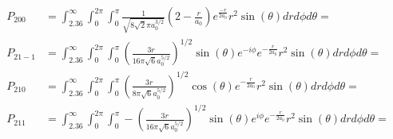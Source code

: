 \documentclass[10pt]{article} %
\begin{document}
\begin{align*}
  P_{200} &= \int_{2.36}^\infty \int_0^{2\pi} \int_0^\pi
  \frac{1}{\sqrt{8\sqrt{2}\pi a_0^{3/2}}}\left(2-\frac{r}{a_0}\right)e^{\frac{-r}{2a_0}}
  r^2\sin(\theta)drd\phi d\theta = \\
  P_{21-1} &= \int_{2.36}^\infty \int_0^{2\pi} \int_0^\pi
  \left(\frac{3r}{16\pi\sqrt{6}a_0^{5/2}}\right)^{1/2}\sin(\theta)e^{-i\phi}e^{-\frac{r}{2a_0}}
  r^2\sin(\theta)drd\phi d\theta = \\
  P_{210} &= \int_{2.36}^\infty \int_0^{2\pi} \int_0^\pi
  \left(\frac{3r}{8\pi\sqrt{6}a_0^{5/2}}\right)^{1/2}\cos(\theta)e^{-\frac{r}{2a_0}}
  r^2\sin(\theta)drd\phi d\theta = \\
  P_{211} &= \int_{2.36}^\infty \int_0^{2\pi} \int_0^\pi
  -\left(\frac{3r}{16\pi\sqrt{6}a_0^{5/2}}\right)^{1/2}\sin(\theta)e^{i\phi}e^{-\frac{r}{2a_0}}
  r^2\sin(\theta)drd\phi d\theta = \\
\end{align*}
\end{document}
